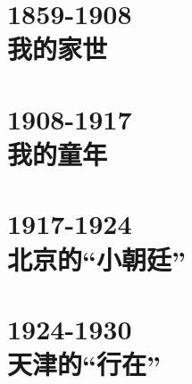 \documentclass[oneside,openright,headings=optiontohead]{scrbook}
\begin{document}
\begin{figure}[ht]
\begin{center}

\end{center}
\end{figure}
\newpage
{\color{TEXTColor}
\tableofcontents
\thispagestyle{empty}
\newpage
\part{1859-1908\\\hspace{1cm}我的家世}





\part{1908-1917\\\hspace{1cm}我的童年}






\part{1917-1924\\\hspace{1cm}北京的“小朝廷”}













\part{1924-1930\\\hspace{1cm}天津的“行在”}







}
\end{document}
